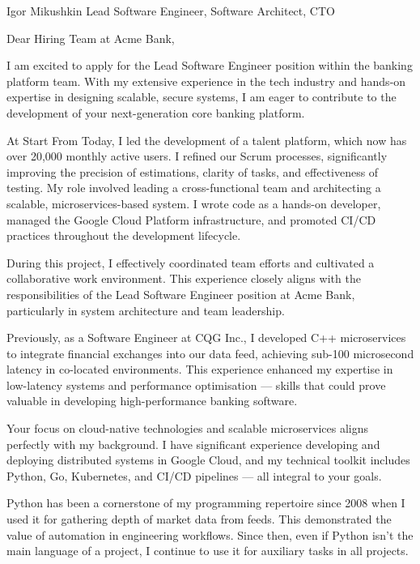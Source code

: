 \documentclass[9pt,a4paper]{juicv}
\begin{document}
\begin{paracol}{2}
\cvHeader
    {Igor Mikushkin}
    {}
    {Lead Software Engineer, Software Architect, CTO}

\setlength{\parskip}{0.7em}

Dear Hiring Team at Acme Bank,

I am excited to apply for the Lead Software Engineer position
within the banking platform team.
With my extensive experience in the tech industry
and hands-on expertise in designing scalable, secure systems,
I am eager to contribute to the development
of your next-generation core banking platform.

At Start From Today, I led the development of a talent platform,
which now has over 20,000 monthly active users.
I refined our Scrum processes, significantly improving the precision of estimations,
clarity of tasks, and effectiveness of testing.
My role involved leading a cross-functional team
and architecting a scalable, microservices-based system.
I wrote code as a hands-on developer,
managed the Google Cloud Platform infrastructure,
and promoted CI/CD practices throughout the development lifecycle.

During this project, I effectively coordinated team efforts
and cultivated a collaborative work environment.
This experience closely aligns with the responsibilities
of the Lead Software Engineer position at Acme Bank,
particularly in system architecture and team leadership.

Previously, as a Software Engineer at CQG Inc.,
I developed C++ microservices to integrate financial exchanges into our data feed,
achieving sub-100 microsecond latency in co-located environments.
This experience enhanced my expertise
in low-latency systems and performance optimisation
--- skills that could prove valuable in developing high-performance banking software.

Your focus on cloud-native technologies
and scalable microservices aligns perfectly with my background.
I have significant experience developing
and deploying distributed systems in Google Cloud,
and my technical toolkit includes Python, Go, Kubernetes, and CI/CD pipelines
--- all integral to your goals.

Python has been a cornerstone of my programming repertoire since 2008
when I used it for gathering depth of market data from feeds.
This demonstrated the value of automation in engineering workflows.
Since then, even if Python isn't the main language of a project,
I continue to use it for auxiliary tasks in all projects.


\end{paracol}
\end{document}
